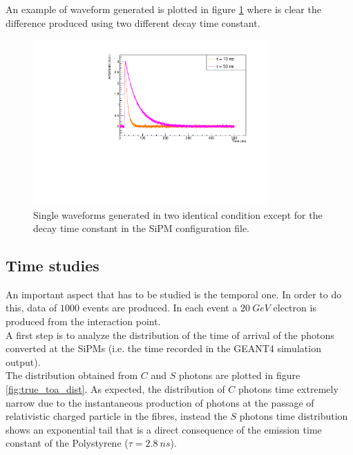 An example of waveform generated is plotted in figure \ref{fig:diff_wf} where is clear the difference produced using two different decay time constant.

\begin{figure}
	\centering
	\includegraphics[width=0.8\textwidth]{IMG/Cap5/wf_different_conf}
	\caption{Single waveforms generated in two identical condition except for the decay time constant in the SiPM configuration file.}
	\label{fig:diff_wf}
\end{figure}

\subsection{Time studies} \label{subsec:Time}
An important aspect that has to be studied is the temporal one.
In order to do this, data of $1000$ events are produced. In each event a $20\ GeV$ electron is produced from the interaction point.\\
A first step is to analyze the distribution of the time of arrival of the photons converted at the SiPMs (i.e. the time recorded in the GEANT4 simulation output).\\
The distribution obtained from $C$ and $S$ photons are plotted in figure \ref{fig:true_toa_dist}.
As expected, the distribution of $C$ photons time extremely narrow due to the instantaneous production of photons at the passage of relativistic charged particle in the fibres, instead the $S$ photons time distribution shows an exponential tail that is a direct consequence of the emission time constant of the Polystyrene ($\tau = 2.8\ ns$).\\

